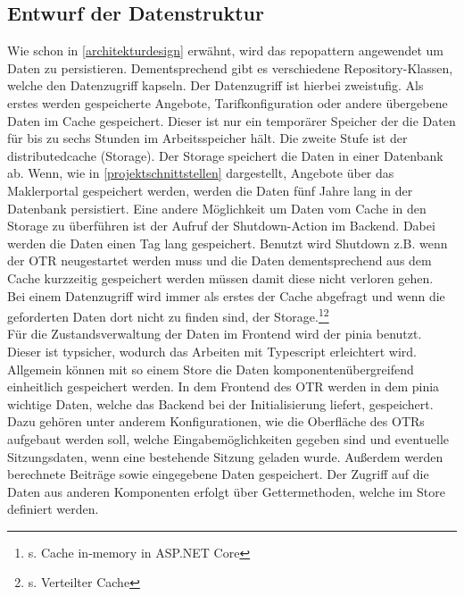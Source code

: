 \subsection{Entwurf der Datenstruktur}
\label{datenmodell}
Wie schon in \ref{architekturdesign}  erwähnt, wird das \gls{repopattern} angewendet um Daten zu persistieren. Dementsprechend gibt es verschiedene Repository-Klassen, welche den Datenzugriff kapseln. Der Datenzugriff ist hierbei zweistufig. Als erstes werden gespeicherte Angebote, Tarifkonfiguration oder andere übergebene Daten im Cache gespeichert. Dieser ist nur ein temporärer Speicher der die Daten für bis zu sechs Stunden im Arbeitsspeicher hält. Die zweite Stufe ist der \gls{distributedcache} (Storage). Der Storage speichert die Daten in einer Datenbank ab.
Wenn, wie in \ref{projektschnittstellen}  dargestellt, Angebote über das Maklerportal gespeichert werden, werden die Daten fünf Jahre lang in der Datenbank persistiert. Eine andere Möglichkeit um Daten vom Cache in den Storage zu überführen ist der Aufruf der Shutdown-Action im Backend. Dabei werden die Daten einen Tag lang gespeichert. Benutzt wird Shutdown z.B. wenn der \ac{OTR} neugestartet werden muss und die Daten dementsprechend aus dem Cache kurzzeitig gespeichert werden müssen damit diese nicht verloren gehen.\\
Bei einem Datenzugriff wird immer als erstes der Cache abgefragt und wenn die geforderten Daten dort nicht zu finden sind, der Storage.\footnote{s.\cite{CacheNet2022} Cache in-memory in ASP.NET Core}\footnote{s.\cite{Verteilter-Cache2021} Verteilter Cache}\\
Für die Zustandsverwaltung der Daten im Frontend wird der \gls{pinia} benutzt. Dieser ist typsicher, wodurch das Arbeiten mit Typescript erleichtert wird. Allgemein können mit so einem Store die Daten komponentenübergreifend einheitlich gespeichert werden. In dem Frontend des \ac{OTR} werden in dem \gls{pinia} wichtige Daten, welche das Backend bei der Initialisierung liefert, gespeichert. Dazu gehören unter anderem Konfigurationen, wie die Oberfläche des \ac{OTR}s aufgebaut werden soll, welche Eingabemöglichkeiten gegeben sind und eventuelle Sitzungsdaten, wenn eine bestehende Sitzung geladen wurde. Außerdem werden berechnete Beiträge sowie eingegebene Daten gespeichert. Der Zugriff auf die Daten aus anderen Komponenten erfolgt über Gettermethoden, welche im Store definiert werden.
